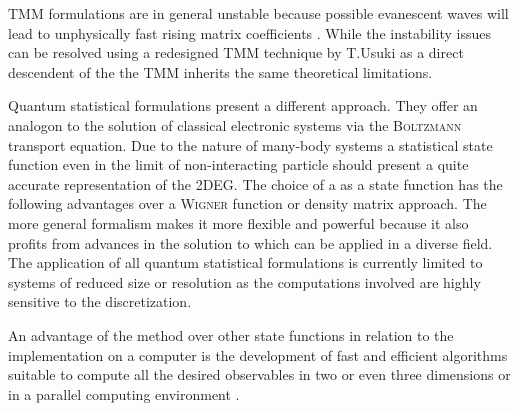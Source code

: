 TMM formulations are in general unstable because possible evanescent waves will lead to unphysically fast rising matrix coefficients \cite{PhysRevB.38.9945}.
While the instability issues can be resolved using a redesigned TMM technique by T.Usuki \cite{PhysRevB.50.7615}\cite{PhysRevB.52.8244} as a direct descendent of the \sdg{} the TMM inherits the same theoretical limitations.\par
Quantum statistical formulations present a different approach. They offer an analogon to the solution of classical electronic systems via the \textsc{Boltzmann} transport equation. 
Due to the nature of many-body systems a statistical state function even in the limit of non-interacting particle should present a quite accurate representation of the 2DEG. The choice of a \gfnc{} as a state function has the following advantages over a \textsc{Wigner} function or density matrix approach.
The more general formalism makes it more flexible and powerful because it also profits from advances in the solution to \gfnc{} which can be applied in a diverse field.  The application of all quantum statistical formulations is currently limited to systems of reduced size or resolution as the computations involved are highly sensitive to the discretization.\par
An advantage of the \gfnc{} method over other state functions in relation to the implementation on a computer is the development of fast and efficient algorithms suitable to compute all the desired observables \cite{JApplPhys.91.2343} in two or even three dimensions or in a parallel computing environment \cite{Drouvelis2006parallel}.
